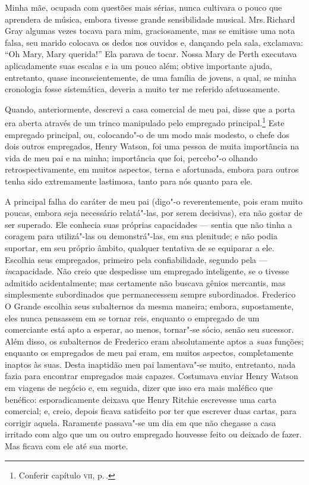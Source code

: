 Minha mãe, ocupada com questões mais sérias, nunca cultivara o
pouco que aprendera de música, embora tivesse grande sensibilidade
musical. Mrs.\,Richard Gray algumas vezes tocava para mim, graciosamente,
mas se emitisse uma nota falsa, seu marido colocava os dedos nos ouvidos
e, dançando pela sala, exclamava: ``Oh Mary, Mary querida!'' Ela parava
de tocar. Nossa Mary de Perth executava aplicadamente suas escalas e ia
um pouco além; obtive importante ajuda, entretanto, quase
inconscientemente, de uma família de jovens, a qual, se minha cronologia
fosse sistemática, deveria a muito ter me referido afetuosamente.

Quando, anteriormente, descrevi a casa comercial de meu pai, disse que a
porta era aberta através de um trinco manipulado pelo empregado
principal.\footnote{Conferir capítulo \textsc{vii}, p.\,\pageref{153}.} Este
empregado principal, ou, colocando"-o de um modo mais modesto, o chefe
dos dois outros empregados, Henry Watson, foi uma pessoa de muita
importância na vida de meu pai e na minha; importância que foi,
percebo"-o olhando retrospectivamente, em muitos aspectos, terna e
afortunada, embora para outros tenha sido extremamente lastimosa, tanto
para nós quanto para ele.

A principal falha do caráter de meu pai (digo"-o reverentemente, pois
eram muito poucas, embora seja necessário relatá"-las, por serem
decisivas), era não gostar de ser superado. Ele conhecia suas próprias
capacidades --- sentia que não tinha a coragem para utilizá"-las ou
demonstrá"-las, em sua plenitude; e não podia suportar, em seu próprio
âmbito, qualquer tentativa de se equiparar a ele. Escolhia seus
empregados, primeiro pela confiabilidade, segundo pela ---
\textit{in}capacidade. Não creio que despedisse um empregado inteligente,
se o tivesse admitido acidentalmente; mas certamente não buscava gênios
mercantis, mas simplesmente subordinados que permanecessem sempre
subordinados. Frederico O Grande escolhia seus subalternos da mesma
maneira; embora, supostamente, eles nunca pensassem em se tornar reis,
enquanto o empregado de um comerciante está apto a esperar, ao menos,
tornar"-se sócio, senão seu sucessor. Além disso, os subalternos de
Frederico eram absolutamente aptos a \textit{suas} funções; enquanto os
empregados de meu pai eram, em muitos aspectos, completamente inaptos às
suas. Desta inaptidão meu pai lamentava"-se muito, entretanto, nada fazia
para encontrar empregados mais capazes. Costumava enviar Henry Watson em
viagens de negócio e, em seguida, dizer que isso era mais maléfico que
benéfico: esporadicamente deixava que Henry Ritchie escrevesse uma carta
comercial; e, creio, depois ficava satisfeito por ter que escrever duas
cartas, para corrigir aquela. Raramente passava"-se um dia em que não
chegasse a casa irritado com algo que um ou outro empregado houvesse
feito ou deixado de fazer. Mas ficava com ele até sua morte.

